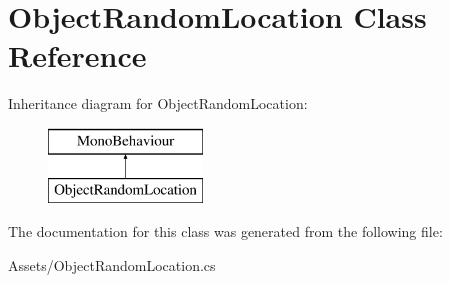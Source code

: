 \hypertarget{class_object_random_location}{}\section{Object\+Random\+Location Class Reference}
\label{class_object_random_location}
Inheritance diagram for Object\+Random\+Location\+:\begin{figure}[H]
\begin{center}
\leavevmode
\includegraphics[height=2.000000cm]{class_object_random_location}
\end{center}
\end{figure}


The documentation for this class was generated from the following file\+:\begin{DoxyCompactItemize}
\item 
Assets/Object\+Random\+Location.\+cs\end{DoxyCompactItemize}
